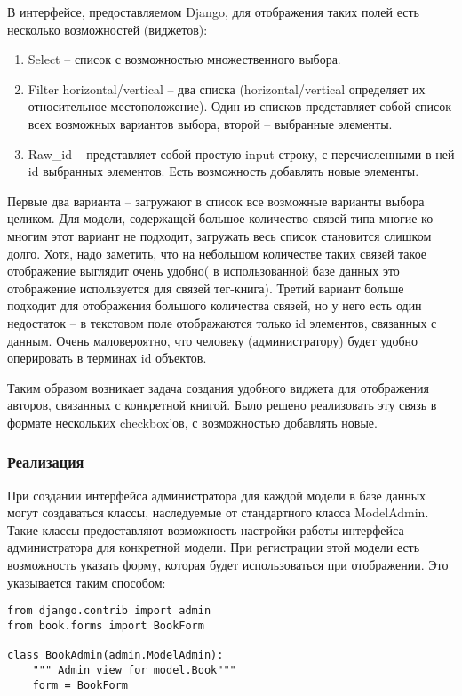 \documentclass[a4paper, 12pt]{report}
\begin{document}
В интерфейсе, предоставляемом Django, для отображения таких полей есть несколько возможностей (виджетов):
\begin{enumerate}
	\item Select -- список с возможностью множественного выбора.
	\item Filter horizontal/vertical -- два списка (horizontal/vertical определяет их относительное местоположение). Один из списков представляет собой список всех возможных вариантов выбора, второй -- выбранные элементы.
	\item Raw\_id -- представляет собой простую input-строку, с перечисленными в ней id выбранных элементов. Есть возможность добавлять новые элементы.
\end{enumerate}
Первые два варианта -- загружают в список все возможные варианты выбора целиком. Для модели, содержащей большое количество связей типа многие-ко-многим этот вариант не подходит, \tk загружать весь список становится слишком долго. Хотя, надо заметить, что на небольшом количестве таких связей такое отображение выглядит очень удобно( в использованной базе данных это отображение используется для связей тег-книга). 
Третий вариант больше подходит для отображения большого количества связей, но у него есть один недостаток -- в текстовом поле отображаются только id элементов, связанных с данным. Очень маловероятно, что человеку (администратору) будет удобно оперировать в терминах id объектов.

Таким образом возникает задача создания удобного виджета для отображения авторов, связанных с конкретной книгой.
Было решено реализовать эту связь в формате нескольких checkbox'ов, с возможностью добавлять
новые.

\subsubsection{Реализация}

При создании интерфейса администратора для каждой модели в базе данных могут создаваться классы, наследуемые от стандартного класса ModelAdmin. Такие классы предоставляют возможность настройки работы интерфейса администратора для конкретной модели. При регистрации этой модели есть возможность указать форму, которая будет использоваться при отображении. Это указывается таким способом:

\begin{verbatim}
from django.contrib import admin
from book.forms import BookForm

class BookAdmin(admin.ModelAdmin):
    """ Admin view for model.Book"""
    form = BookForm
\end{verbatim}
\end{document}
